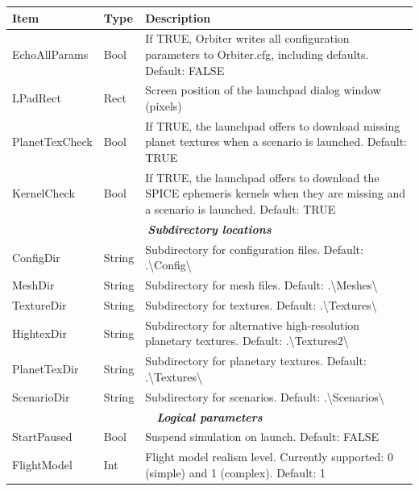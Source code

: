 \documentclass[Orbiter User Manual.tex]{subfiles}
\begin{document}
	\begin{longtable}{ |p{}|p{}|p{}| }
	\hline\rule{0pt}{2ex}
	\textbf{Item} & \textbf{Type} & \textbf{Description}\\
	\hline\rule{0pt}{2ex}
	EchoAllParams & Bool & If TRUE, Orbiter writes all configuration parameters to Orbiter.cfg, including defaults. Default: FALSE\\
	\hline\rule{0pt}{2ex}
	LPadRect & Rect & Screen position of the launchpad dialog window (pixels)\\
	\hline\rule{0pt}{2ex}
	PlanetTexCheck & Bool & If TRUE, the launchpad offers to download missing planet textures when a scenario is launched. Default: TRUE\\
	\hline\rule{0pt}{2ex}
	KernelCheck & Bool & If TRUE, the launchpad offers to download the SPICE ephemeris kernels when they are missing and a scenario is launched. Default: TRUE\\
	\hline
	\multicolumn{3}{|c|}{\rule{0pt}{2ex}\textbf{\textit{Subdirectory locations}}}\\
	\hline\rule{0pt}{2ex}
	ConfigDir & String & Subdirectory for configuration files. Default: .\textbackslash Config\textbackslash\\
	\hline\rule{0pt}{2ex}
	MeshDir & String & Subdirectory for mesh files. Default: .\textbackslash Meshes\textbackslash\\
	\hline\rule{0pt}{2ex}
	TextureDir & String & Subdirectory for textures. Default: .\textbackslash Textures\textbackslash\\
	\hline\rule{0pt}{2ex}
	HightexDir & String & Subdirectory for alternative high-resolution planetary textures. Default: .\textbackslash Textures2\textbackslash\\
	\hline\rule{0pt}{2ex}
	PlanetTexDir & String & Subdirectory for planetary textures. Default: .\textbackslash Textures\textbackslash\\
	\hline\rule{0pt}{2ex}
	ScenarioDir & String & Subdirectory for scenarios. Default: .\textbackslash Scenarios\textbackslash\\
	\hline
	\multicolumn{3}{|c|}{\rule{0pt}{2ex}\textbf{\textit{Logical parameters}}}\\
	\hline\rule{0pt}{2ex}
	StartPaused & Bool & Suspend simulation on launch. Default: FALSE\\
	\hline\rule{0pt}{2ex}
	FlightModel & Int & Flight model realism level. Currently supported: 0 (simple) and 1 (complex). Default: 1\\

\end{longtable}
\end{document}
